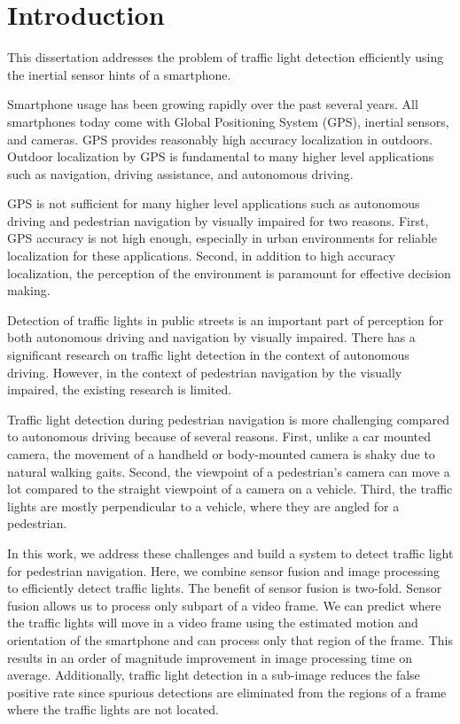 \chapter{Introduction}

This dissertation addresses the problem of traffic light detection efficiently using the inertial sensor hints of a smartphone.

Smartphone usage has been growing rapidly over the past several years. 
All smartphones today come with Global Positioning System (GPS), inertial sensors, and cameras. 
GPS provides reasonably high accuracy localization in outdoors. 
Outdoor localization by GPS is fundamental to many higher level applications such as navigation, driving assistance, and autonomous driving.

GPS is not sufficient for many higher level applications such as autonomous driving and pedestrian navigation by visually impaired for two reasons.
First, GPS accuracy is not high enough, especially in urban environments for reliable localization for these applications. 
Second, in addition to high accuracy localization, the perception of the environment is paramount for effective decision making. 

Detection of traffic lights in public streets is an important part of perception for both autonomous driving and navigation by visually impaired.  
There has a significant research  on traffic light detection in the context of autonomous driving. 
However, in the context of pedestrian navigation by the visually impaired, the existing research is limited. 

Traffic light detection during pedestrian navigation is more challenging compared to autonomous driving because of several reasons. 
First, unlike a car mounted camera, the movement of a handheld or body-mounted camera is shaky due to natural walking gaits. 
Second, the viewpoint of a pedestrian's camera can move a lot compared to the straight viewpoint of a camera on a vehicle.
Third, the traffic lights are mostly perpendicular to a vehicle, where they are angled for a pedestrian. 

In this work, we address these challenges and build a system to detect traffic light for pedestrian navigation.
Here, we combine sensor fusion and image processing to efficiently detect traffic lights. 
The benefit of sensor fusion is two-fold.
Sensor fusion allows us to process only subpart of a video frame.
We can predict where the traffic lights will move in a video frame using the estimated motion and orientation of the smartphone and can process only that region of the frame. 
This results in an order of magnitude improvement in image processing time on average. 
Additionally, traffic light detection in a sub-image reduces the false positive rate since spurious detections are eliminated from the regions of a frame where the traffic lights are not located.

